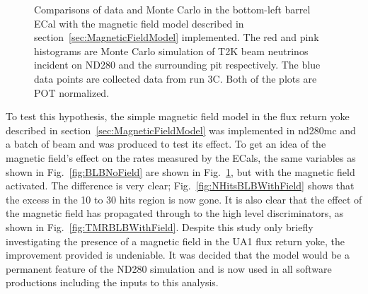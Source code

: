 \begin{figure}[bottom]%
  \centering
  \caption{Comparisons of data and Monte Carlo in the bottom-left barrel ECal with the magnetic field model described in section~\ref{sec:MagneticFieldModel} implemented.  The red and pink histograms are Monte Carlo simulation of T2K beam neutrinos incident on ND280 and the surrounding pit respectively.  The blue data points are collected data from run 3C.  Both of the plots are POT normalized.}
  \label{fig:BLBWithField}
\end{figure}
To test this hypothesis, the simple magnetic field model in the flux return yoke described in section~\ref{sec:MagneticFieldModel} was implemented in nd280mc and a batch of beam and  was produced to test its effect.  To get an idea of the magnetic field's effect on the rates measured by the ECals, the same variables as shown in Fig.~\ref{fig:BLBNoField} are shown in Fig.~\ref{fig:BLBWithField}, but with the magnetic field activated.  The difference is very clear; Fig.~\ref{fig:NHitsBLBWithField} shows that the excess in the 10 to 30 hits region is now gone.  It is also clear that the effect of the magnetic field has propagated through to the high level discriminators, as shown in Fig.~\ref{fig:TMRBLBWithField}.
\newline
\newline
Despite this study only briefly investigating the presence of a magnetic field in the UA1 flux return yoke, the improvement provided is undeniable.  It was decided that the model would be a permanent feature of the ND280 simulation and is now used in all software productions including the inputs to this analysis.
